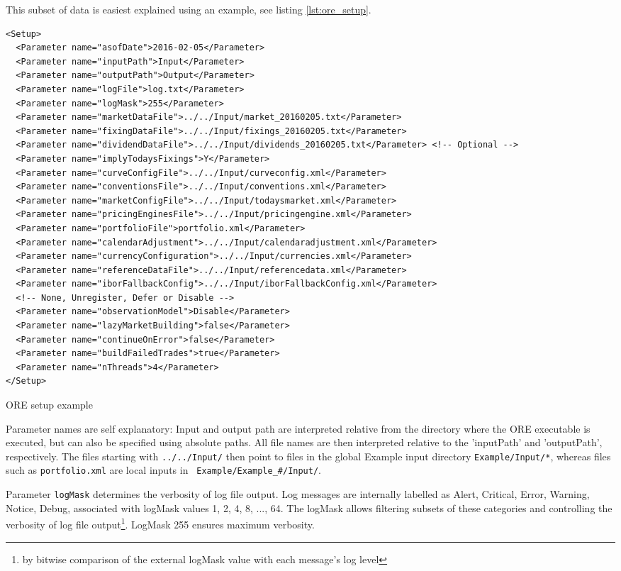 \documentclass[12pt, a4paper]{article}
\begin{document}
This subset of data is easiest explained using an example, see listing \ref{lst:ore_setup}.
\begin{listing}[H]
\begin{verbatim}
<Setup>
  <Parameter name="asofDate">2016-02-05</Parameter>
  <Parameter name="inputPath">Input</Parameter>
  <Parameter name="outputPath">Output</Parameter>
  <Parameter name="logFile">log.txt</Parameter>
  <Parameter name="logMask">255</Parameter>
  <Parameter name="marketDataFile">../../Input/market_20160205.txt</Parameter>
  <Parameter name="fixingDataFile">../../Input/fixings_20160205.txt</Parameter>
  <Parameter name="dividendDataFile">../../Input/dividends_20160205.txt</Parameter> <!-- Optional -->
  <Parameter name="implyTodaysFixings">Y</Parameter>
  <Parameter name="curveConfigFile">../../Input/curveconfig.xml</Parameter>
  <Parameter name="conventionsFile">../../Input/conventions.xml</Parameter>
  <Parameter name="marketConfigFile">../../Input/todaysmarket.xml</Parameter>
  <Parameter name="pricingEnginesFile">../../Input/pricingengine.xml</Parameter>
  <Parameter name="portfolioFile">portfolio.xml</Parameter>
  <Parameter name="calendarAdjustment">../../Input/calendaradjustment.xml</Parameter>
  <Parameter name="currencyConfiguration">../../Input/currencies.xml</Parameter>
  <Parameter name="referenceDataFile">../../Input/referencedata.xml</Parameter>
  <Parameter name="iborFallbackConfig">../../Input/iborFallbackConfig.xml</Parameter>
  <!-- None, Unregister, Defer or Disable -->
  <Parameter name="observationModel">Disable</Parameter>
  <Parameter name="lazyMarketBuilding">false</Parameter>
  <Parameter name="continueOnError">false</Parameter>
  <Parameter name="buildFailedTrades">true</Parameter>
  <Parameter name="nThreads">4</Parameter>
</Setup>
\end{verbatim}
\caption{ORE setup example}
\label{lst:ore_setup}
\end{listing}

Parameter names are self explanatory: Input and output path are interpreted relative from the directory where the ORE
executable is executed, but can also be specified using absolute paths. All file names are then interpreted relative to the
'inputPath' and 'outputPath', respectively. The files starting with {\tt ../../Input/} then point to files in the global
Example input directory {\tt Example/Input/*}, whereas files such as {\tt portfolio.xml} are local inputs in {\tt 
Example/Example\_\#/Input/}. 

Parameter {\tt logMask} determines the verbosity of log file output. Log messages are 
internally labelled as Alert, Critical, Error, Warning, Notice, Debug, associated with logMask values 1, 2, 4, 8, ..., 64. 
The logMask allows filtering subsets of these categories and controlling the verbosity of log file output\footnote{by bitwise comparison of the external logMask value with each message's log level}. LogMask 255 ensures maximum verbosity. \\
\end{document}
